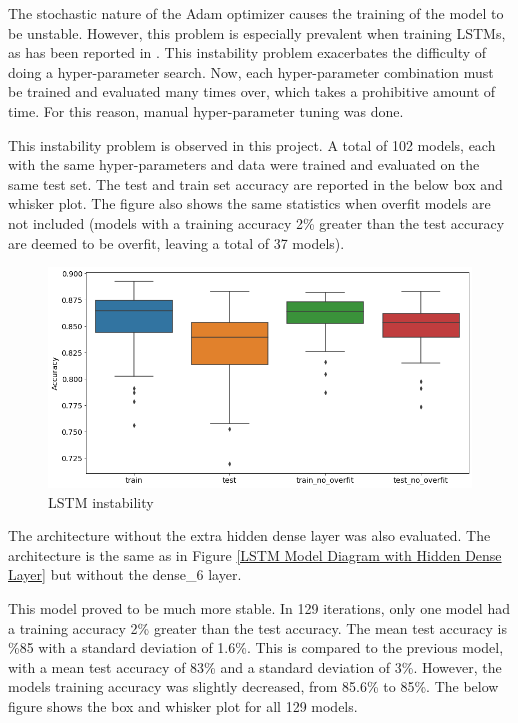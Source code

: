 \documentclass[12pt]{article}
\begin{document}
The stochastic nature of the Adam optimizer causes the training of the model to be unstable. However, this problem is especially prevalent when training LSTMs, as has been reported in \cite{StableReccurantModels, LSTMInstability}. This instability problem exacerbates the difficulty of doing a hyper-parameter search. Now, each hyper-parameter combination must be trained and evaluated many times over, which takes a prohibitive amount of time. For this reason, manual hyper-parameter tuning was done.

This instability problem is observed in this project. A total of 102 models, each with the same hyper-parameters and data were trained and evaluated on the same test set. The test and train set accuracy are reported in the below box and whisker plot. The figure also shows the same statistics when overfit models are not included (models with a training accuracy 2\% greater than the test accuracy are deemed to be overfit, leaving a total of 37 models).

\begin{figure}[H]
\centering\caption{LSTM instability}
\includegraphics[scale=0.4]{LSTM instability.png}
\end{figure}

The architecture without the extra hidden dense layer was also evaluated. The architecture is the same as in Figure \ref{LSTM Model Diagram with Hidden Dense Layer} but without the dense\_6 layer. 

This model proved to be much more stable. In 129 iterations, only one model had a training accuracy 2\% greater than the test accuracy. The mean test accuracy is \%85 with a standard deviation of 1.6\%. This is compared to the previous model, with a mean test accuracy of 83\% and a standard deviation of 3\%. However, the models training accuracy was slightly decreased, from 85.6\% to 85\%. The below figure shows the box and whisker plot for all 129 models.
\end{document}

